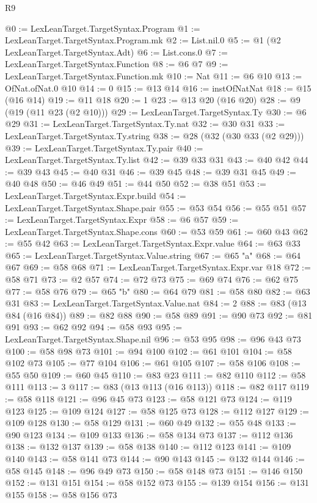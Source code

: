 \begin{lexlean}{R9}
\begin{coremodule}
{{{{{@0 := LexLeanTarget.TargetSyntax.Program
@1 := LexLeanTarget.TargetSyntax.Program.mk
@2 := List.nil.{0}
@5 := @1 (@2 LexLeanTarget.TargetSyntax.Adt)
@6 := List.cons.{0}
@7 := LexLeanTarget.TargetSyntax.Function
@8 := @6 @7
@9 := LexLeanTarget.TargetSyntax.Function.mk
@10 := Nat
@11 := @6 @10
@13 := OfNat.ofNat.{0} @10
@14 := 0
@15 := @13 @14
@16 := instOfNatNat
@18 := @15 (@16 @14)
@19 := @11 @18
@20 := 1
@23 := @13 @20 (@16 @20)
@28 := @9 (@19 (@11 @23 (@2 @10)))
@29 := LexLeanTarget.TargetSyntax.Ty
@30 := @6 @29
@31 := LexLeanTarget.TargetSyntax.Ty.nat
@32 := @30 @31
@33 := LexLeanTarget.TargetSyntax.Ty.string
@38 := @28 (@32 (@30 @33 (@2 @29)))
@39 := LexLeanTarget.TargetSyntax.Ty.pair
@40 := LexLeanTarget.TargetSyntax.Ty.list
@42 := @39 @33 @31
@43 := @40 @42
@44 := @39 @43
@45 := @40 @31
@46 := @39 @45
@48 := @39 @31 @45
@49 := @40 @48
@50 := @46 @49
@51 := @44 @50
@52 := @38 @51
@53 := LexLeanTarget.TargetSyntax.Expr.build
@54 := LexLeanTarget.TargetSyntax.Shape.pair
@55 := @53 @54
@56 := @55 @51
@57 := LexLeanTarget.TargetSyntax.Expr
@58 := @6 @57
@59 := LexLeanTarget.TargetSyntax.Shape.cons
@60 := @53 @59
@61 := @60 @43
@62 := @55 @42
@63 := LexLeanTarget.TargetSyntax.Expr.value
@64 := @63 @33
@65 := LexLeanTarget.TargetSyntax.Value.string
@67 := @65 "a"
@68 := @64 @67
@69 := @58 @68
@71 := LexLeanTarget.TargetSyntax.Expr.var @18
@72 := @58 @71
@73 := @2 @57
@74 := @72 @73
@75 := @69 @74
@76 := @62 @75
@77 := @58 @76
@79 := @65 "b"
@80 := @64 @79
@81 := @58 @80
@82 := @63 @31
@83 := LexLeanTarget.TargetSyntax.Value.nat
@84 := 2
@88 := @83 (@13 @84 (@16 @84))
@89 := @82 @88
@90 := @58 @89
@91 := @90 @73
@92 := @81 @91
@93 := @62 @92
@94 := @58 @93
@95 := LexLeanTarget.TargetSyntax.Shape.nil
@96 := @53 @95
@98 := @96 @43 @73
@100 := @58 @98 @73
@101 := @94 @100
@102 := @61 @101
@104 := @58 @102 @73
@105 := @77 @104
@106 := @61 @105
@107 := @58 @106
@108 := @55 @50
@109 := @60 @45
@110 := @83 @23
@111 := @82 @110
@112 := @58 @111
@113 := 3
@117 := @83 (@13 @113 (@16 @113))
@118 := @82 @117
@119 := @58 @118
@121 := @96 @45 @73
@123 := @58 @121 @73
@124 := @119 @123
@125 := @109 @124
@127 := @58 @125 @73
@128 := @112 @127
@129 := @109 @128
@130 := @58 @129
@131 := @60 @49
@132 := @55 @48
@133 := @90 @123
@134 := @109 @133
@136 := @58 @134 @73
@137 := @112 @136
@138 := @132 @137
@139 := @58 @138
@140 := @112 @123
@141 := @109 @140
@143 := @58 @141 @73
@144 := @90 @143
@145 := @132 @144
@146 := @58 @145
@148 := @96 @49 @73
@150 := @58 @148 @73
@151 := @146 @150
@152 := @131 @151
@154 := @58 @152 @73
@155 := @139 @154
@156 := @131 @155
@158 := @58 @156 @73
}}}}}
\end{coremodule}
\end{lexlean}
